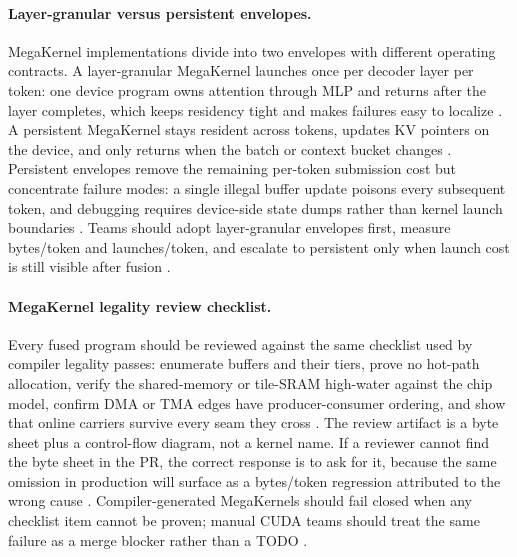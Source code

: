 \paragraph{Layer-granular versus persistent envelopes.}
MegaKernel implementations divide into two envelopes with different operating contracts. A layer-granular MegaKernel launches once per decoder layer per token: one device program owns attention through MLP and returns after the layer completes, which keeps residency tight and makes failures easy to localize \citep{dao2022flashattention,yirage2026,chen2020compilerbasedhardw}. A persistent MegaKernel stays resident across tokens, updates KV pointers on the device, and only returns when the batch or context bucket changes \citep{nvidia2024cudagraphs,taxbreak2026,memoryfloor2026}. Persistent envelopes remove the remaining per-token submission cost but concentrate failure modes: a single illegal buffer update poisons every subsequent token, and debugging requires device-side state dumps rather than kernel launch boundaries \citep{patel2025llminference,memoryfloor2026}. Teams should adopt layer-granular envelopes first, measure bytes/token and launches/token, and escalate to persistent only when launch cost is still visible after fusion \citep{taxbreak2026,yirage2026}.

\paragraph{MegaKernel legality review checklist.}
Every fused program should be reviewed against the same checklist used by compiler legality passes: enumerate buffers and their tiers, prove no hot-path allocation, verify the shared-memory or tile-SRAM high-water against the chip model, confirm DMA or TMA edges have producer-consumer ordering, and show that online carriers survive every seam they cross \citep{semianalysis2024tma,nvidia2022hopper,amd2024aie,yirage2026}. The review artifact is a byte sheet plus a control-flow diagram, not a kernel name. If a reviewer cannot find the byte sheet in the PR, the correct response is to ask for it, because the same omission in production will surface as a bytes/token regression attributed to the wrong cause \citep{memoryfloor2026,taxbreak2026,patel2025llminference}. Compiler-generated MegaKernels should fail closed when any checklist item cannot be proven; manual CUDA teams should treat the same failure as a merge blocker rather than a TODO \citep{chen2020compilerbasedhardw,memoryfloor2026}.

